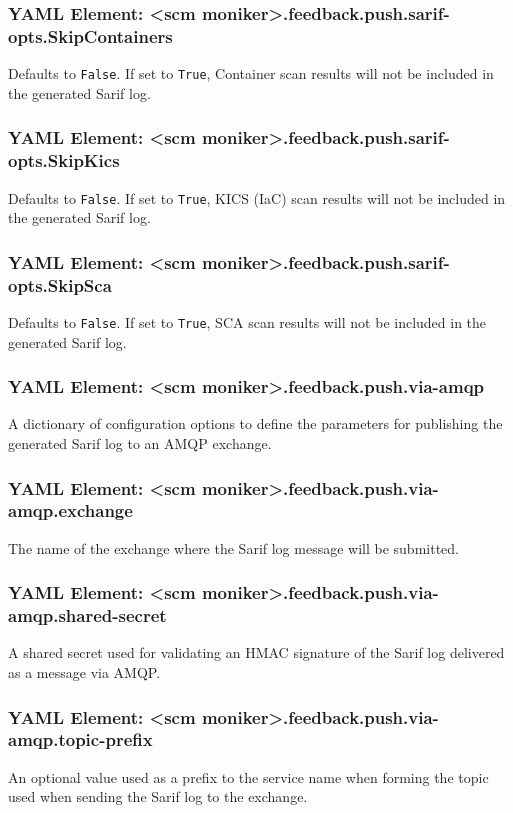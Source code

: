 \subsubsection{YAML Element: <scm moniker>.feedback.push.sarif-opts.SkipContainers}\label{sec:yaml-push-sarif-opts-skipcontainers}
Defaults to \texttt{False}.  If set to \texttt{True}, Container scan results will not be included in the generated Sarif log.
\subsubsection{YAML Element: <scm moniker>.feedback.push.sarif-opts.SkipKics}\label{sec:yaml-push-sarif-opts-skipkics}
Defaults to \texttt{False}.  If set to \texttt{True}, KICS (IaC) scan results will not be included in the generated Sarif log.
\subsubsection{YAML Element: <scm moniker>.feedback.push.sarif-opts.SkipSca}\label{sec:yaml-push-sarif-opts-skipsca}
Defaults to \texttt{False}.  If set to \texttt{True}, SCA scan results will not be included in the generated Sarif log.

\subsubsection{YAML Element: <scm moniker>.feedback.push.via-amqp}\label{sec:yaml-push-via-amqp}
A dictionary of configuration options to define the parameters for publishing the generated Sarif log to an AMQP exchange.

\subsubsection{YAML Element: <scm moniker>.feedback.push.via-amqp.exchange}\label{sec:yaml-push-via-amqp-exchange}
The name of the exchange where the Sarif log message will be submitted.

\subsubsection{YAML Element: <scm moniker>.feedback.push.via-amqp.shared-secret}\label{sec:yaml-push-via-amqp-shared-secret}
A shared secret used for validating an HMAC signature of the Sarif log delivered as a message via AMQP.

\subsubsection{YAML Element: <scm moniker>.feedback.push.via-amqp.topic-prefix}\label{sec:yaml-push-via-amqp-topic-prefix}
An optional value used as a prefix to the service name when forming the topic used when sending the Sarif log to the exchange.

